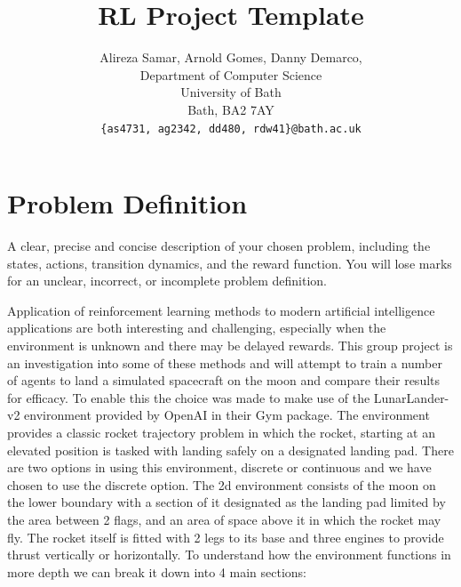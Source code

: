 \documentclass{article}
\title{RL Project Template}
\author{
  Alireza Samar, Arnold Gomes, Danny Demarco, 
  \\
  Department of Computer Science\\
  University of Bath\\
  Bath, BA2 7AY \\
  \texttt{\{as4731, ag2342, dd480, rdw41\}@bath.ac.uk} \\
}
\begin{document}
\maketitle

\section{Problem Definition}
A clear, precise and concise description of your chosen problem,
including the states, actions, transition dynamics, and the reward function. You will lose
marks for an unclear, incorrect, or incomplete problem definition.

Application of reinforcement learning methods to modern artificial intelligence applications are both interesting and challenging, especially when the environment is unknown and there may be delayed rewards. This group project is an investigation into some of these methods and will attempt to train a number of agents to land a simulated spacecraft on the moon and compare their results for efficacy. To enable this the choice was made to make use of the LunarLander-v2 environment provided by OpenAI in their Gym package. The environment provides a classic rocket trajectory problem in which the rocket, starting at an elevated position is tasked with landing safely on a designated landing pad. There are two options in using this environment, discrete or continuous and we have chosen to use the discrete option. The 2d environment consists of the moon on the lower boundary with a section of it designated as the landing pad limited by the area between 2 flags, and an area of space above it in which the rocket may fly. The rocket itself is fitted with 2 legs to its base and three engines to provide thrust vertically or horizontally. To understand how the environment functions in more depth we can break it down into 4 main sections:
\end{document}
